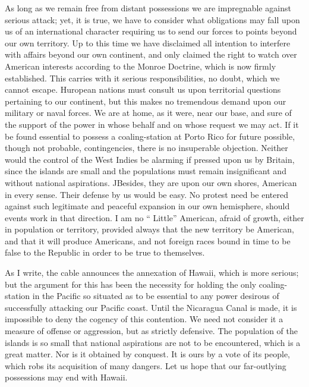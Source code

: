 \documentclass[11pt,openany]{book}
\begin{document}
As long as we remain free from distant possessions we are impregnable against serious attack; yet, it is true, we have to consider what obligations may fall upon us of an international character requiring us to send our forces to points beyond our own territory. Up to this time we have disclaimed all intention to interfere with affairs beyond our own continent, and only claimed the right to watch over American interests according to the Monroe Doctrine, which is now firmly established. This carries with it serious responsibilities, no doubt, which we cannot escape. Huropean nations must consult us upon territorial questions pertaining to our continent, but this makes no tremendous demand upon our military or naval forces. We are at home, as it were, near our base, and sure of the support of the power in whose behalf and on whose request we may act. If it be found essential to possess a coaling-station at Porto Rico for future possible, though not probable, contingencies, there is no insuperable objection. Neither would the control of the West Indies be alarming if pressed upon us by Britain, since the islands are small and the populations must remain insignificant and without national aspirations. JBesides, they are upon our own shores, American in every sense. Their defense by us would be easy. No protest need be entered against such legitimate and peaceful expansion in our own hemisphere, should events work in that direction. I am no `` Little'' American, afraid of growth, either in population or territory, provided always that the new territory be American, and that it will produce Americans, and not foreign races bound in time to be false to the Republic in order to be true to themselves.

As I write, the cable announces the annexation of Hawaii, which is more serious; but the argument for this has been the necessity for holding the only coaling-station in the Pacific so situated as to be essential to any power desirous of successfully attacking our Pacific coast. Until the Nicaragua Canal is made, it is impossible to deny the cogency of this contention. We need not consider it a measure of offense or aggression, but as strictly defensive. The population of the islands is so small that national aspirations are not to be encountered, which is a great matter. Nor is it obtained by conquest. It is ours by a vote of its people, which robs its acquisition of many dangers. Let us hope that our far-outlying possessions may end with Hawaii.
\end{document}
